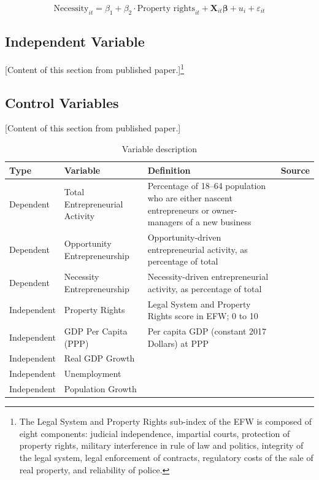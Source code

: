 \documentclass[12pt]{article}
\begin{document}
\begin{equation}\label{eq:necessity}
    \text{Necessity}_{it} = \beta_1 + \beta_2 \cdot \text{Property rights}_{it} + \mathbf{X}_{it}\boldsymbol{\beta} + u_i + \varepsilon_{it}
\end{equation}

\subsection{Independent Variable}\label{subsec:independent_variable}

[Content of this section from published paper.]\footnote{The Legal System and Property Rights sub-index of the EFW is composed of eight components: judicial independence, impartial courts, protection of property rights, military interference in rule of law and politics, integrity of the legal system, legal enforcement of contracts, regulatory costs of the sale of real property, and reliability of police.}

\subsection{Control Variables}\label{subsec:control_variables}

[Content of this section from published paper.]

\begin{table}[H]
    \centering
    \caption{Variable description}
    \label{tab:variable_description}
    \small
    \begin{tabularx}{\textwidth}{l l X l}
        \toprule
        \textbf{Type} & \textbf{Variable} & \textbf{Definition} & \textbf{Source} \\
        \midrule
        Dependent & Total Entrepreneurial Activity & Percentage of 18--64 population who are either nascent entrepreneurs or owner-managers of a new business & \citet{GEM} \\
        Dependent & Opportunity Entrepreneurship & Opportunity-driven entrepreneurial activity, as percentage of total & \\
        Dependent & Necessity Entrepreneurship & Necessity-driven entrepreneurial activity, as percentage of total & \\
        \midrule
        Independent & Property Rights & Legal System and Property Rights score in EFW; 0 to 10 & \citet{Gwartney2021} \\
        Independent & GDP Per Capita (PPP) & Per capita GDP (constant 2017 Dollars) at PPP & \citet{WorldBank} \\
        Independent & Real GDP Growth & & \\
        Independent & Unemployment & & \\
        Independent & Population Growth & & \\
        \bottomrule
    \end{tabularx}
\end{table}
\end{document}
